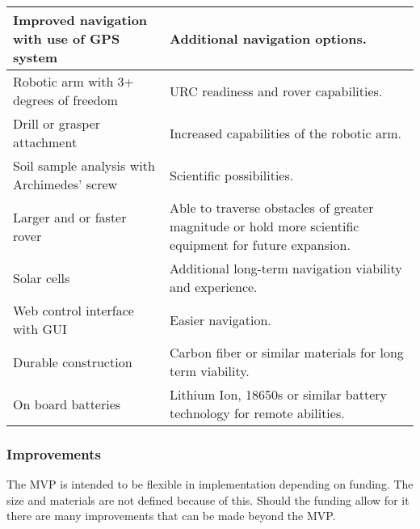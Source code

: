 \documentclass[conference]{IEEEtran} %
\begin{document}
\begin{table}[hb!]
{\begin{tabularx}{\linewidth}{LL}
    \hline
    Improved navigation with use of GPS system & Additional navigation options. \\
    \hline
    Robotic arm with 3+ degrees of freedom & URC readiness and rover capabilities. \\ 
    \hline
    Drill or grasper attachment & Increased capabilities of the robotic arm. \\
    \hline
    Soil sample analysis with Archimedes' screw & Scientific possibilities. \\
    \hline
    Larger and or faster rover & Able to traverse obstacles of greater magnitude or hold more scientific equipment for future expansion. \\
    \hline
    Solar cells & Additional long-term navigation viability and experience. \\
    \hline
    Web control interface with GUI & Easier navigation. \\
    \hline
    Durable construction & Carbon fiber or similar materials for long term viability. \\
    \hline
    On board batteries & Lithium Ion, 18650s or similar battery technology for remote abilities. \\
    \hline
    \end{tabularx}
    }
\label{tab:mvp-one}
\end{table}

\subsubsection{Improvements}

  The MVP is intended to be flexible in implementation depending on funding. The size and materials are not defined because of this. Should the funding allow for it there are many improvements that can be made beyond the MVP. 

\end{document}
